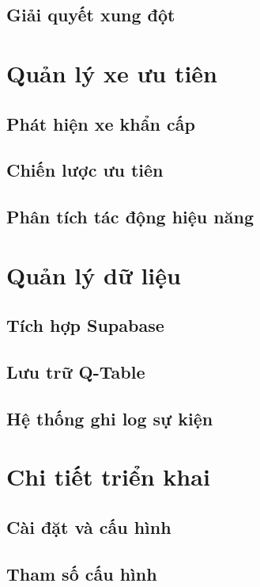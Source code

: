 \documentclass[12pt,a4paper,oneside]{report}
\begin{document}
\section{Giải quyết xung đột}

\chapter{Quản lý xe ưu tiên}
\section{Phát hiện xe khẩn cấp}
\section{Chiến lược ưu tiên}
\section{Phân tích tác động hiệu năng}

\chapter{Quản lý dữ liệu}
\section{Tích hợp Supabase}
\section{Lưu trữ Q-Table}
\section{Hệ thống ghi log sự kiện}

\chapter{Chi tiết triển khai}
\section{Cài đặt và cấu hình}
\section{Tham số cấu hình}
\end{document}
